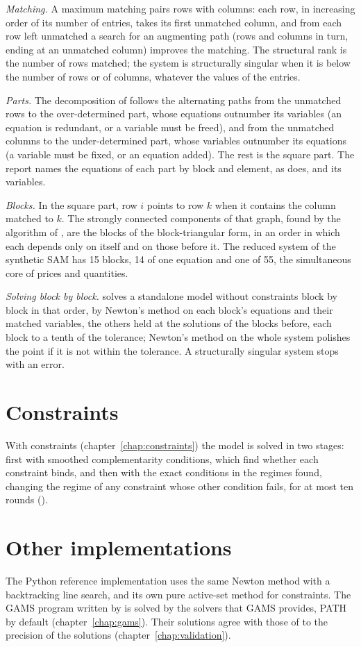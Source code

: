 \textit{Matching.} A maximum matching pairs rows with columns: each row, in
increasing order of its number of entries, takes its first unmatched column,
and from each row left unmatched a search for an augmenting path (rows and
columns in turn, ending at an unmatched column) improves the matching. The
structural rank is the number of rows matched; the system is structurally
singular when it is below the number of rows or of columns, whatever the
values of the entries.

\textit{Parts.} The decomposition of \citet{dulmage1958} follows the
alternating paths from the unmatched rows to the over-determined part, whose
equations outnumber its variables (an equation is redundant, or a variable
must be freed), and from the unmatched columns to the under-determined part,
whose variables outnumber its equations (a variable must be fixed, or an
equation added). The rest is the square part. The report names the
equations of each part by block and element, as  does,
and its variables.

\textit{Blocks.} In the square part, row $i$ points to row $k$ when it
contains the column matched to $k$. The strongly connected components of
that graph, found by the algorithm of \citet{tarjan1972}, are the blocks of
the block-triangular form, in an order in which each depends only on itself
and on those before it. The reduced system of the synthetic SAM has 15
blocks, 14 of one equation and one of 55, the simultaneous core of prices
and quantities.

\textit{Solving block by block.}  solves a standalone
model without constraints block by block in that order, by Newton's method
on each block's equations and their matched variables, the others held at
the solutions of the blocks before, each block to a tenth of the tolerance;
Newton's method on the whole system polishes the point if it is not within
the tolerance. A structurally singular system stops with an error.

\section{Constraints}\label{sec:solution-constraints}

With constraints (chapter~\ref{chap:constraints}) the model is solved in two
stages: first with smoothed complementarity conditions, which find whether each
constraint binds, and then with the exact conditions in the regimes found,
changing the regime of any constraint whose other condition fails, for at most
ten rounds ().

\section{Other implementations}

The Python reference implementation uses the same Newton method with a
backtracking line search, and its own pure active-set method for constraints.
The GAMS program written by  is solved by the solvers that
GAMS provides, PATH by default (chapter~\ref{chap:gams}). Their solutions agree
with those of  to the precision of the solutions
(chapter~\ref{chap:validation}).
